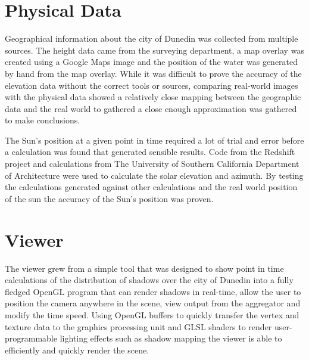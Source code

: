 \documentclass[12pt]{report}
\begin{document}
\section{Physical Data}
Geographical information about the city of Dunedin was collected from multiple sources. The height data came from the surveying department, a map overlay was created using a Google Maps\cite{gmaps} image and the position of the water was generated by hand from the map overlay. While it was difficult to prove the accuracy of the elevation data without the correct tools or sources, comparing real-world images with the physical data showed a relatively close mapping between the geographic data and the real world to gathered a close enough approximation was gathered to make conclusions. 

The Sun's position at a given point in time required a lot of trial and error before a calculation was found that generated sensible results. Code from the Redshift project\cite{redshift} and calculations from The University of Southern California Department of Architecture\cite{solarazi} were used to calculate the solar elevation and azimuth. By testing the calculations generated against other calculations  and the real world position of the sun the accuracy of the Sun's position was proven.


\section{Viewer}
The viewer grew from a simple tool that was designed to show point in time calculations of the distribution of shadows over the city of Dunedin into a fully fledged OpenGL program that can render shadows in real-time, allow the user to position the camera anywhere in the scene, view output from the aggregator and modify the time speed. Using OpenGL buffers to quickly transfer the vertex and texture data to the graphics processing unit and GLSL shaders to render user-programmable lighting effects such as shadow mapping the viewer is able to efficiently and quickly render the scene.
\end{document}
